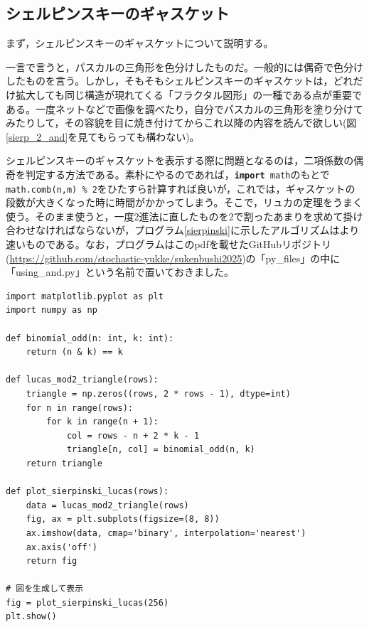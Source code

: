 \subsection{シェルピンスキーのギャスケット}
まず，シェルピンスキーのギャスケットについて説明する。

一言で言うと，パスカルの三角形を色分けしたものだ。一般的には偶奇で色分けしたものを言う。しかし，そもそもシェルピンスキーのギャスケットは，どれだけ拡大しても同じ構造が現れてくる「フラクタル図形」の一種である点が重要である。一度ネットなどで画像を調べたり，自分でパスカルの三角形を塗り分けてみたりして，その容貌を目に焼き付けてからこれ以降の内容を読んで欲しい(図\ref{sierp_2_and}を見てもらっても構わない)。

\vspace{10pt}

シェルピンスキーのギャスケットを表示する際に問題となるのは，二項係数の偶奇を判定する方法である。素朴にやるのであれば，\texttt{\textbf{import} math}のもとで\texttt{math.comb(n,m) \% 2}をひたすら計算すれば良いが，これでは，ギャスケットの段数が大きくなった時に時間がかかってしまう。そこで，リュカの定理をうまく使う。そのまま使うと，一度2進法に直したものを2で割ったあまりを求めて掛け合わせなければならないが，プログラム\ref{sierpinski}に示したアルゴリズムはより速いものである。なお，プログラムはこのpdfを載せたGitHubリポジトリ(\url{https://github.com/stochastic-yukke/sukenbushi2025})の「py\_files」の中に「using\_and.py」という名前で置いておきました。

\begin{lstlisting}[caption=uszczelka Sierpińskiego,label=sierpinski]
import matplotlib.pyplot as plt
import numpy as np

def binomial_odd(n: int, k: int):
    return (n & k) == k

def lucas_mod2_triangle(rows):
    triangle = np.zeros((rows, 2 * rows - 1), dtype=int)
    for n in range(rows):
        for k in range(n + 1):
            col = rows - n + 2 * k - 1
            triangle[n, col] = binomial_odd(n, k)
    return triangle

def plot_sierpinski_lucas(rows):
    data = lucas_mod2_triangle(rows)
    fig, ax = plt.subplots(figsize=(8, 8))
    ax.imshow(data, cmap='binary', interpolation='nearest')
    ax.axis('off')
    return fig

# 図を生成して表示
fig = plot_sierpinski_lucas(256)
plt.show()
\end{lstlisting}

